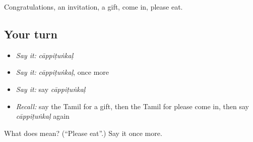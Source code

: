 \begin{grammarlens}[title={What you've built}]
Congratulations, an invitation, a gift, come in, please eat.
\end{grammarlens}

\subsection*{Your turn}
\begin{itemize}
\raggedright
  \item \emph{Say it:} \emph{cāppiṭuṅkaḷ}
  \item \emph{Say it:} \emph{cāppiṭuṅkaḷ}, once more
  \item \emph{Say it:} say \emph{cāppiṭuṅkaḷ}
  \item \emph{Recall:} say the Tamil for a gift, then the Tamil for please come in, then say \emph{cāppiṭuṅkaḷ} again
\end{itemize}

\begin{tcolorbox}[breakable,colback=teal!4,colframe=teal!35!black,title={Before you move on}]
What does  mean? (\textquotedblleft{}Please eat\textquotedblright{}.) Say it once more.
\end{tcolorbox}
